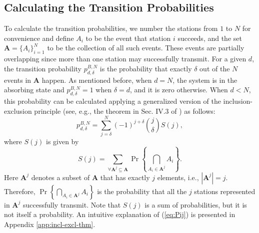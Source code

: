 \documentclass[journal]{IEEEtran}
\def\Abf{{\mathbf{A}}}
\newcommand{\pr}[1]{\Pr \left\{#1\right\}}
\begin{document}
\subsection{Calculating the Transition Probabilities}
To calculate the transition probabilities, we number the stations from $1$ to $N$ for convenience and define $A_i$ to be the event that station $i$ succeeds, and the set $\mathbf{A}=\{A_i\}_{i=1}^{N}$ to be the collection of all such events.
These events are partially overlapping since more than one station may successfully transmit. For a given $d$, the transition probability $p_{d,\delta}^{B,N}$ is the probability that exactly $\delta$ out of the $N$ events in $\Abf$ happen. As mentioned before, when $d = N$, the system is in the absorbing state and $p_{d,\delta}^{B,N} = 1$ when $\delta = d$, and it is zero otherwise. When $d<N$, this probability can be calculated applying a generalized version of the inclusion-exclusion principle (see, e.g., the theorem in Sec. IV.3 of \cite{feller1968ipt}) as follows:
\begin{equation}
\label{eq:Pij}
p^{B,N}_{d,\delta} = \sum_{j=\delta}^{N} (-1)^{j+\delta}\binom{j}{\delta} S(j),
\end{equation}
where $S(j)$ is given by
\begin{equation}
\label{eq:S_j_def}
S(j) = \sum_{\forall \Abf^{j} \subseteq \Abf} \pr{\bigcap_{A_i \in \Abf^{j}} A_i}.
\end{equation}
Here $\Abf^{j}$ denotes a subset of $\Abf$ that has exactly $j$ elements, i.e., $|\mathbf{A}^{j}|=j$. Therefore, $\pr{\bigcap_{A_i \in \Abf^{j}} A_i}$ is the probability that all the $j$ stations represented in $\Abf^{j}$  successfully transmit. Note that $S(j)$ is a sum of probabilities, but it is not itself a probability. An intuitive explanation of (\ref{eq:Pij}) is presented in Appendix \ref{app:incl-excl-thm}.
\end{document}
